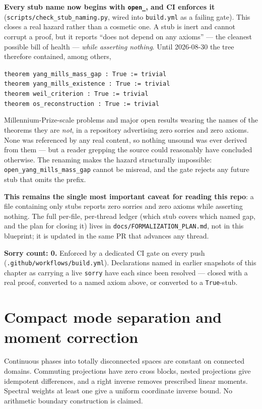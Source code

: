\documentclass{report}
\theoremstyle{definition}
\begin{document}
\begin{itemize}
\begin{itemize}
\medskip
\noindent\textbf{Every stub name now begins with \texttt{open\_}, and CI enforces it}
(\texttt{scripts/check\_stub\_naming.py}, wired into \texttt{build.yml} as a failing gate).
This closes a real hazard rather than a cosmetic one. A stub is inert and cannot corrupt a
proof, but it reports ``does not depend on any axioms'' --- the cleanest possible bill of
health --- \emph{while asserting nothing}. Until 2026-08-30 the tree therefore contained,
among others,
\begin{center}
\texttt{theorem yang\_mills\_mass\_gap : True := trivial}\\
\texttt{theorem yang\_mills\_existence : True := trivial}\\
\texttt{theorem weil\_criterion : True := trivial}\\
\texttt{theorem os\_reconstruction : True := trivial}
\end{center}
Millennium-Prize-scale problems and major open results wearing the names of the theorems
they are \emph{not}, in a repository advertising zero sorries and zero axioms. None was
referenced by any real content, so nothing unsound was ever derived from them --- but a
reader grepping the source could reasonably have concluded otherwise. The renaming makes
the hazard structurally impossible: \texttt{open\_yang\_mills\_mass\_gap} cannot be misread,
and the gate rejects any future stub that omits the prefix.

\medskip
\noindent\textbf{This remains the single most important caveat for reading this repo}: a
file containing only stubs reports zero sorries and zero axioms while asserting nothing.
The full per-file, per-thread ledger (which stub covers which named gap, and the plan for
closing it) lives in \texttt{docs/FORMALIZATION\_PLAN.md}, not in this blueprint; it is
updated in the same PR that advances any thread.

\textbf{Sorry count: 0.} Enforced by a dedicated CI gate on every push
(\texttt{.github/workflows/build.yml}). Declarations named in earlier snapshots of this
chapter as carrying a live \texttt{sorry} have each since been resolved --- closed with a
real proof, converted to a named axiom above, or converted to a \texttt{True}-stub.

\section{Compact mode separation and moment correction}
Continuous phases into totally disconnected spaces are constant on connected domains.
Commuting projections have zero cross blocks, nested projections give idempotent differences,
and a right inverse removes prescribed linear moments. Spectral weights at least one give
a uniform coordinate inverse bound. No arithmetic boundary construction is claimed.


\end{itemize}
\end{itemize}
\end{document}

